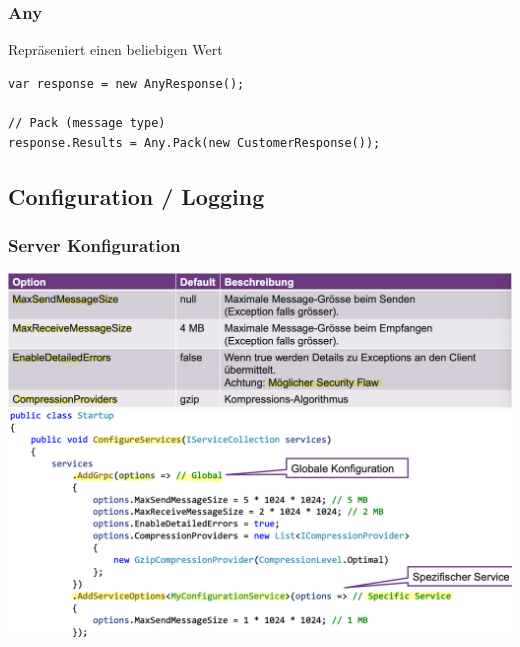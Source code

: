 \subsubsection{Any}
Repräseniert einen beliebigen Wert
\begin{lstlisting}
var response = new AnyResponse();

// Pack (message type)
response.Results = Any.Pack(new CustomerResponse());
\end{lstlisting}


\subsection{Configuration / Logging}
\subsubsection{Server Konfiguration}
\begin{center}
    \includegraphics[scale=.28]{graphic/gprc/Server Konfiguration.png}
    \includegraphics[scale=.4]{graphic/gprc/Server Konfiguration2.png}
\end{center}
\vspace{-8pt}

